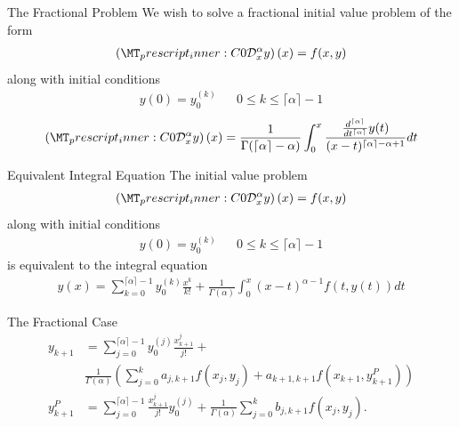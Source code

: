 \documentclass[pdf]{beamer}
\newcommand{\capder}[4]{ \left( \prescript{C}{#1}{\mathcal{D}_{#2}^{#3}} #4 \right) }
\begin{document}
\begin{frame}{The Fractional Problem}
    We wish to solve a fractional initial value problem of the form
    \begin{align*}
        \capder{0}{x}{\alpha}{y}(x) = f(x,y)
    \end{align*}
    along with initial conditions
    \begin{align*}
        y(0) = y_0^{(k)} & & 0 \leq k \leq \lceil \alpha \rceil - 1
    \end{align*}
    \hrulefill
    \begin{align*}
        \capder{0}{x}{\alpha}{y}(x) = \frac{1}{\Gamma( \lceil \alpha \rceil - \alpha)} \int_{0}^{x} \frac{\frac{d^{\lceil \alpha \rceil}}{dt^{\lceil \alpha \rceil}} y(t)}{(x-t)^{\lceil \alpha \rceil - \alpha + 1}}dt
    \end{align*}
\end{frame}

\begin{frame}{Equivalent Integral Equation}
The initial value problem
    \begin{align*}
        \capder{0}{x}{\alpha}{y}(x) = f(x,y)
    \end{align*}
    along with initial conditions
    \begin{align*}
        y(0) = y_0^{(k)} & & 0 \leq k \leq \lceil \alpha \rceil - 1
    \end{align*}
    is equivalent to the integral equation
    \begin{align*}
        y(x) = \sum_{k = 0}^{\lceil \alpha \rceil - 1} y_0^{(k)} \frac{x^k}{k!} + \frac{1}{\Gamma(\alpha)} \int_0^x (x - t)^{\alpha - 1}f(t,y(t))dt
    \end{align*}
\end{frame}

\begin{frame}{The Fractional Case}
    \begin{align*}
    y_{k+1} &= \sum_{j=0}^{\lceil \alpha \rceil - 1} y_{0}^{(j)} \frac{x^j_{k+1}}{j!} + \\
    & \frac{1}{\Gamma(\alpha)} \left( \sum_{j=0}^k a_{j,k+1} f(x_j,y_j) + a_{k+1,k+1}f(x_{k+1}, y_{k+1}^P )\right) \\
    y_{k+1}^P &= \sum_{j=0}^{\lceil \alpha \rceil - 1} \frac{x^{j}_{k+1}}{j!} y_{0}^{(j)} + \frac{1}{\Gamma(\alpha)} \sum_{j=0}^{k} b_{j,k+1} f(x_j, y_j).
\end{align*}

\end{frame}
\end{document}
